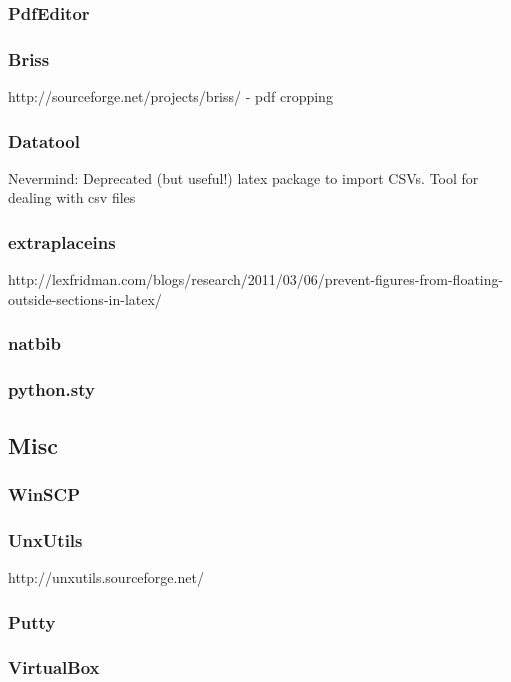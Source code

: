 \documentclass[a4paper,11pt]{report}
\begin{document}
\subsubsection*{PdfEditor}
\subsubsection*{Briss}
http://sourceforge.net/projects/briss/ - pdf cropping
\subsubsection*{Datatool}
Nevermind: Deprecated (but useful!) latex package to import CSVs.
Tool for dealing with csv files

\subsubsection*{extraplaceins}
http://lexfridman.com/blogs/research/2011/03/06/prevent-figures-from-floating-outside-sections-in-latex/

\subsubsection*{natbib}

\subsubsection*{python.sty}

\subsection{Misc}
\subsubsection*{WinSCP}

\subsubsection*{UnxUtils}
http://unxutils.sourceforge.net/

\subsubsection*{Putty}

\subsubsection*{VirtualBox}
\end{document}
